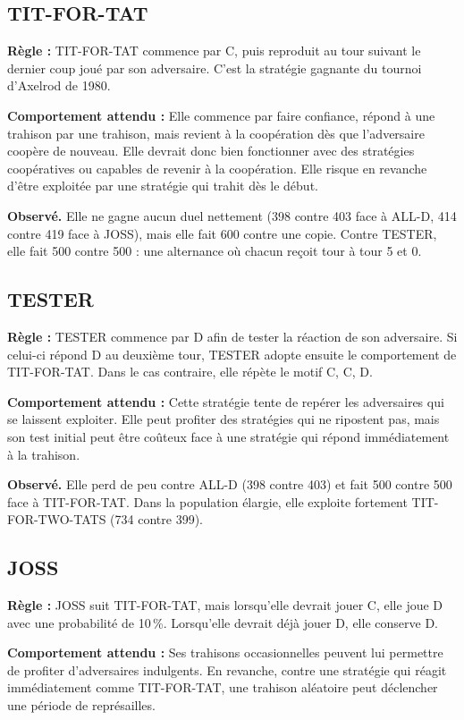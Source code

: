 \documentclass[10pt,a4paper]{article}
\begin{document}
\subsection{TIT-FOR-TAT}
\textbf{Règle :} TIT-FOR-TAT commence par C, puis reproduit au tour suivant le dernier coup joué par son adversaire. C'est la
stratégie gagnante du tournoi d'Axelrod de 1980.

\textbf{Comportement attendu :} Elle commence par faire confiance, répond à une trahison par une trahison, mais revient à la
coopération dès que l'adversaire coopère de nouveau. Elle devrait donc bien fonctionner avec des stratégies coopératives ou
capables de revenir à la coopération. Elle risque en revanche d'être exploitée par une stratégie qui trahit dès le début.

\textbf{Observé.} Elle ne gagne aucun duel nettement (398 contre 403 face à ALL-D, 414 contre 419 face à JOSS), mais elle fait
600 contre une copie. Contre TESTER, elle fait 500 contre 500 : une alternance où chacun reçoit tour à tour 5 et 0.

\subsection{TESTER}
\textbf{Règle :} TESTER commence par D afin de tester la réaction de son adversaire. Si celui-ci répond D au deuxième tour,
TESTER adopte ensuite le comportement de TIT-FOR-TAT. Dans le cas contraire, elle répète le motif C, C, D.

\textbf{Comportement attendu :} Cette stratégie tente de repérer les adversaires qui se laissent exploiter. Elle peut profiter
des stratégies qui ne ripostent pas, mais son test initial peut être coûteux face à une stratégie qui répond immédiatement à la
trahison.

\textbf{Observé.} Elle perd de peu contre ALL-D (398 contre 403) et fait 500 contre 500 face à TIT-FOR-TAT. Dans la population
élargie, elle exploite fortement TIT-FOR-TWO-TATS (734 contre 399).

\subsection{JOSS}
\textbf{Règle :} JOSS suit TIT-FOR-TAT, mais lorsqu'elle devrait jouer C, elle joue D avec une probabilité de 10\,\%. Lorsqu'elle
devrait déjà jouer D, elle conserve D.

\textbf{Comportement attendu :} Ses trahisons occasionnelles peuvent lui permettre de profiter d'adversaires indulgents. En
revanche, contre une stratégie qui réagit immédiatement comme TIT-FOR-TAT, une trahison aléatoire peut déclencher une période
de représailles.
\end{document}
